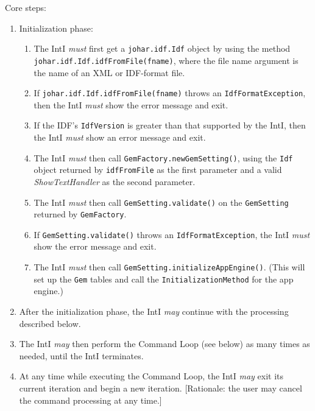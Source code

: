 \documentclass[11pt]{article}
\newcommand{\must}{{\it must}}
\newcommand{\may}{{\it may}}
\newcounter{coreReq}
\begin{document}
\noindent
Core steps:
\begin{enumerate}
\setcounter{enumi}{\value{coreReq}}
\item Initialization phase:
  \begin{enumerate}
  \item The IntI {\must} first get a {\tt johar.idf.Idf} object by using the
    method {\tt johar.idf.Idf.idfFromFile(fname)}, where the file name
    argument is the name of an XML or IDF-format file.
  \item If {\tt johar.idf.Idf.idfFromFile(fname)} throws an
    {\tt IdfFormatException}, then the IntI {\must} show the error message
    and exit.
  \item If the IDF's {\tt IdfVersion} is greater than that supported
    by the IntI, then the IntI {\must} show an error message
    and exit.
  \item The IntI {\must} then call {\tt GemFactory.newGemSetting()},
    using the {\tt Idf} object returned by {\tt idfFromFile} as the
    first parameter and a valid {\it ShowTextHandler} as the second
    parameter.
  \item The IntI {\must} then call {\tt GemSetting.validate()} on the
    {\tt GemSetting} returned by {\tt GemFactory}.
  \item If {\tt GemSetting.validate()} throws an
    {\tt IdfFormatException}, the IntI {\must} show the error message
    and exit.
  \item The IntI {\must} then call {\tt GemSetting.initializeAppEngine()}.
    (This will set up the {\tt Gem} tables and call the
    {\tt InitializationMethod} for the app engine.)
  \end{enumerate}
\item After the initialization phase, the IntI {\may}
  continue with the processing described below.
\item The IntI {\may} then perform the Command Loop
  (see below) as many times as needed, until the IntI terminates.
\item At any time while executing the Command Loop, the IntI
  {\may} exit its current iteration and begin a new iteration.
  [Rationale: the user may cancel the command processing at any time.]
\setcounter{coreReq}{\value{enumi}}
\end{enumerate}
\end{document}
